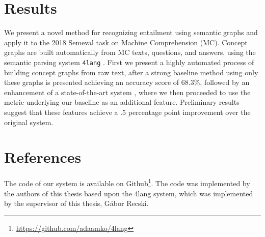 \section{Results}
We present a novel method for recognizing entailment using semantic
graphs and apply it to the 2018 Semeval task on Machine
Comprehension (MC).
Concept graphs are built automatically from MC texts, questions, and answers,
using the semantic parsing system \texttt{4lang} \cite{Recski:2016d}.
First we present a highly automated process of building concept graphs from raw text, after
a strong baseline method using only these graphs is presented achieving an accuracy score of $68.3\%$,
followed by an enhancement of a state-of-the-art system
\cite{Wang:2018}, where we then proceeded to use the metric underlying our baseline as an
additional feature. Preliminary results suggest that these features
achieve a .5 percentage point improvement over the original system.

\section{References}
The code of our system is available on Github\footnote{\url{https://github.com/adaamko/4lang}}. The code was implemented by the authors of this thesis based upon the 4lang system, which was implemented by the supervisor of this thesis, Gábor Recski.
